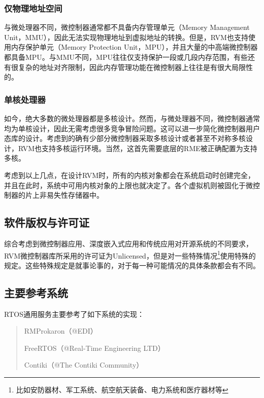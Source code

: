 \subsubsection{仅物理地址空间}\label{subsubsec:1-1-1-5}

与微处理器不同，微控制器通常都不具备内存管理单元（Memory Management
Unit，MMU），因此无法实现物理地址到虚拟地址的转换。但是，RVM也支持使用内存保护单元（Memory
Protection
Unit，MPU），并且大量的中高端微控制器都具备MPU。与MMU不同，MPU往往仅支持保护一段或几段内存范围，有些还有很复杂的地址对齐限制，因此内存管理功能在微控制器上往往是有很大局限性的。

\subsubsection{单核处理器}\label{subsubsec:1-1-1-6}

如今，绝大多数的微处理器都是多核设计。然而，与微处理器不同，微控制器通常均为单核设计，因此无需考虑很多竞争冒险问题。这可以进一步简化微控制器用户态库的设计。考虑到的确有少部分微控制器采取多核设计或者甚至不对称多核设计，RVM也支持多核运行环境。当然，这首先需要底层的RME被正确配置为支持多核。

考虑到以上几点，在设计RVM时，所有的内核对象都会在系统启动时创建完全，并且在此时，系统中可用内核对象的上限也就决定了。各个虚拟机则被固化于微控制器的片上非易失性存储器中。

\subsection{软件版权与许可证}\label{subsec:1-1-2}

综合考虑到微控制器应用、深度嵌入式应用和传统应用对开源系统的不同要求，RVM微控制器库所采用的许可证为Unlicensed，但是对一些特殊情况\footnote{比如安防器材、军工系统、航空航天装备、电力系统和医疗器材等}使用特殊的规定。这些特殊规定是就事论事的，对于每一种可能情况的具体条款都会有不同。

\subsection{主要参考系统}\label{subsec:1-1-3}

RTOS通用服务主要参考了如下系统的实现：

\begin{quote}
RMProkaron（@EDI）

FreeRTOS（@Real-Time Engineering LTD）

Contiki（@The Contiki Community）
\end{quote}

